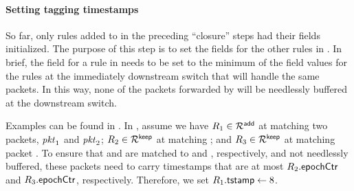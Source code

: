 \hspace*{-\parindent}





\paragraph{Setting tagging timestamps}
So far, only rules added to \addRules in the preceding
``closure'' steps had their \tagTmpField fields initialized.  The
purpose of this step is to set the \tagTmpField fields for the other
rules in \addRules.  In brief, the \tagTmpField field for a rule
 in \addRules needs to be set to the minimum of the
\epochField field values for the rules at the immediately downstream
switch that will handle the same packets.  In this way, none of the
packets forwarded by  will be needlessly buffered at the
downstream switch.

Examples can be found in .  In
, assume we have $\ruleID{1} \in
\addRules$ at  matching two packets, $\pktID{1}$ and
$\pktID{2}$; $\ruleID{2} \in \keepRules$ at  matching
; and $\ruleID{3} \in \keepRules$ at  matching
packet . To ensure that  and  are matched
to  and , respectively, and not needlessly
buffered, these packets need to carry timestamps that are at most
$\ruleID{2}{\epochField}$ and $\ruleID{3}{\epochField}$,
respectively. Therefore, we set $\ruleID{1}{\tagTmpField} \gets 8$.

